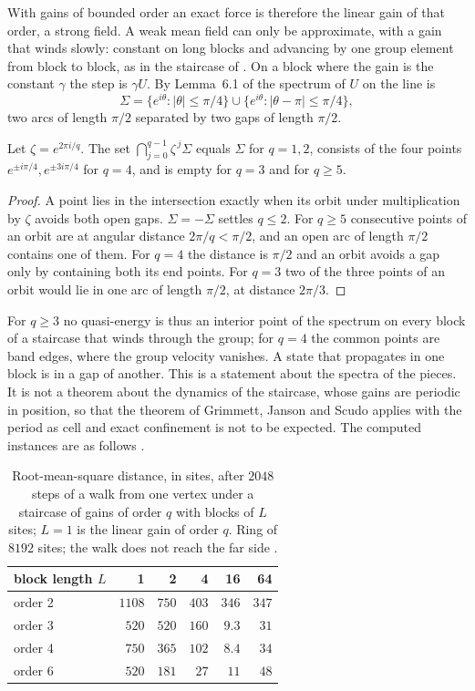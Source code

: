 With gains of bounded order an exact force is therefore the linear gain of that order, a strong field. A weak mean field can only be approximate, with a gain that winds slowly: constant on long blocks and advancing by one group element from block to block, as in the staircase of \cite{g9}. On a block where the gain is the constant $\gamma$ the step is $\gamma U$. By Lemma~6.1 of \cite{g9} the spectrum of $U$ on the line is
\[
\Sigma=\{e^{i\theta}:|\theta|\le\pi/4\}\cup\{e^{i\theta}:|\theta-\pi|\le\pi/4\},
\]
two arcs of length $\pi/2$ separated by two gaps of length $\pi/2$.

\begin{proposition}\label{prop:local}
Let $\zeta=e^{2\pi i/q}$. The set $\bigcap_{j=0}^{q-1}\zeta^{\,j}\Sigma$ equals $\Sigma$ for $q=1,2$, consists of the four points $e^{\pm i\pi/4},e^{\pm3i\pi/4}$ for $q=4$, and is empty for $q=3$ and for $q\ge5$.
\end{proposition}
\begin{proof}
A point lies in the intersection exactly when its orbit under multiplication by $\zeta$ avoids both open gaps. $\Sigma=-\Sigma$ settles $q\le2$. For $q\ge5$ consecutive points of an orbit are at angular distance $2\pi/q<\pi/2$, and an open arc of length $\pi/2$ contains one of them. For $q=4$ the distance is $\pi/2$ and an orbit avoids a gap only by containing both its end points. For $q=3$ two of the three points of an orbit would lie in one arc of length $\pi/2$, at distance $2\pi/3$.
\end{proof}

For $q\ge3$ no quasi-energy is thus an interior point of the spectrum on every block of a staircase that winds through the group; for $q=4$ the common points are band edges, where the group velocity vanishes. A state that propagates in one block is in a gap of another. This is a statement about the spectra of the pieces. It is not a theorem about the dynamics of the staircase, whose gains are periodic in position, so that the theorem of Grimmett, Janson and Scudo \cite{gjs} applies with the period as cell and exact confinement is not to be expected. The computed instances are as follows \cite{comp4s}.

\begin{table}[ht]\centering\small
\begin{tabular}{@{}lrrrrr@{}}\toprule
block length $L$ & 1 & 2 & 4 & 16 & 64\\\midrule
order 2 & $1108$ & $750$ & $403$ & $346$ & $347$\\
order 3 & $520$ & $520$ & $160$ & $9.3$ & $31$\\
order 4 & $750$ & $365$ & $102$ & $8.4$ & $34$\\
order 6 & $520$ & $181$ & $27$ & $11$ & $48$\\\bottomrule
\end{tabular}
\caption{Root-mean-square distance, in sites, after $2048$ steps of a walk from one vertex under a staircase of gains of order $q$ with blocks of $L$ sites; $L=1$ is the linear gain of order $q$. Ring of $8192$ sites; the walk does not reach the far side \cite{comp4s}.}\label{tab:stair}
\end{table}

